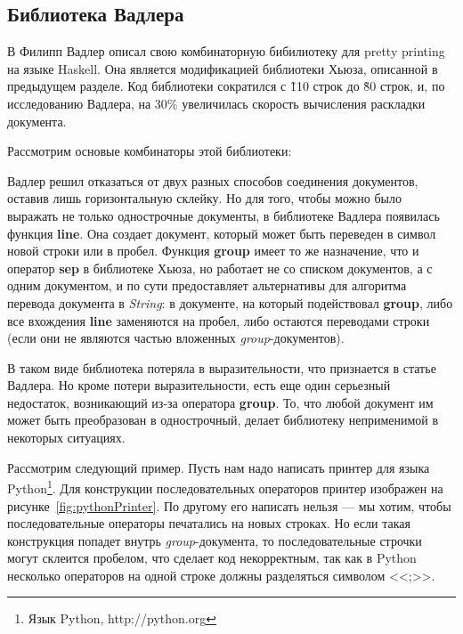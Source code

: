 \newpage

\subsection{Библиотека Вадлера}

В \cite{wadler} Филипп Вадлер описал свою комбинаторную бибилиотеку для pretty printing на языке Haskell. Она является модификацией библиотеки Хьюза, описанной в предыдущем разделе. Код библиотеки сократился с \~110 строк до \~80 строк, и, по исследованию Вадлера, на 30\% увеличилась скорость вычисления раскладки документа.

Рассмотрим основые комбинаторы этой библиотеки:


Вадлер решил отказаться от двух разных способов соединения документов, оставив лишь горизонтальную склейку. Но для того, чтобы можно было выражать не только однострочные документы, в библиотеке Вадлера появилась функция \textbf{line}. Она создает документ, который может быть переведен в символ новой строки или в пробел.
Функция \textbf{group} имеет то же назначение, что и оператор \textbf{sep} в библиотеке Хьюза, но работает не со списком документов, а с одним документом, и по сути предоставляет альтернативы для алгоритма перевода документа в \textit{String}: в документе, на который подействовал \textbf{group}, либо все вхождения \textbf{line} заменяются на пробел, либо остаются переводами строки (если они не являются частью вложенных \textit{group}-документов).

В таком виде библиотека потеряла в выразительности, что признается в статье Вадлера. Но кроме потери выразительности, есть еще один серьезный недостаток, возникающий из-за оператора \textbf{group}. То, что любой документ им может быть преобразован в однострочный, делает библиотеку неприменимой в некоторых ситуациях. 

Рассмотрим следующий пример. Пусть нам надо написать принтер для языка Python\footnote{Язык Python, http://python.org}. Для конструкции последовательных операторов принтер изображен на рисунке~\ref{fig:pythonPrinter}.
По другому его написать нельзя --- мы хотим, чтобы последовательные операторы печатались на новых строках. Но если такая конструкция попадет внутрь \textit{group}-документа, то последовательные строчки могут склеится пробелом, что сделает код некорректным, так как в Python несколько операторов на одной строке должны разделяться символом <<;>>.

